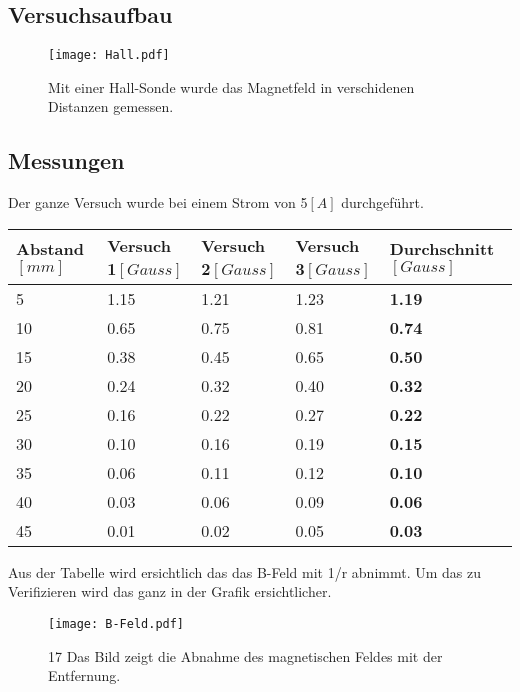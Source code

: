 \documentclass{article}
\begin{document}
\subsection{Versuchsaufbau}
\begin{figure}[H]
	\centering
	\texttt{[image: Hall.pdf]} 
	\caption{Mit einer Hall-Sonde wurde das Magnetfeld in verschidenen Distanzen gemessen.}
\end{figure}
\newpage
\subsection{Messungen}
Der ganze Versuch wurde bei einem Strom von 5$[A]$ durchgeführt.
\begin{table}[H]
	\begin{tabular}{|l|l|l|l|l|}
		\hline
		Abstand$[mm]$ & Versuch 1$[Gauss]$ & Versuch 2$[Gauss]$ & Versuch 3$[Gauss]$ & Durchschnitt$[Gauss]$ \\ \hline
		
		5             & 1.15            & 1.21            & 1.23          &\textbf{1.19}  \\ 
		10            & 0.65            & 0.75            & 0.81          &\textbf{0.74}  \\ 
		15            & 0.38            & 0.45            & 0.65          &\textbf{0.50}  \\ 
		20            & 0.24            & 0.32            & 0.40          &\textbf{0.32}  \\ 
		25            & 0.16            & 0.22            & 0.27          &\textbf{0.22}  \\ 
		30            & 0.10            & 0.16            & 0.19          &\textbf{0.15}  \\ 
		35            & 0.06            & 0.11            & 0.12          &\textbf{0.10}  \\ 
		40            & 0.03            & 0.06            & 0.09          &\textbf{0.06}  \\ 
		45            & 0.01            & 0.02            & 0.05          &\textbf{0.03}  \\
		\hline
	\end{tabular}
\end{table}
Aus der Tabelle wird ersichtlich das das B-Feld mit 1/r abnimmt. Um das zu Verifizieren wird das ganz in der Grafik ersichtlicher.
\begin{figure}[H]
	\centering
	\texttt{[image: B-Feld.pdf]} 
	\caption{17
		Das Bild zeigt die Abnahme des magnetischen Feldes mit der Entfernung.}
\end{figure}
\newpage
\end{document}
